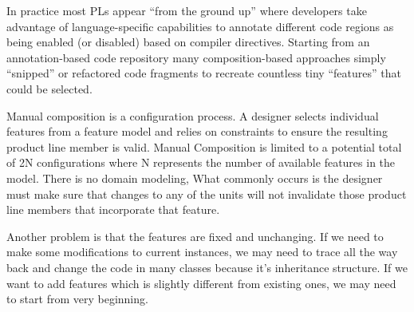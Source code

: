In practice most PLs appear “from the ground up” where developers take advantage of language-specific capabilities
 to annotate different code regions as being enabled (or disabled) based on compiler directives. Starting from an
 annotation-based code repository many composition-based approaches simply “snipped” or refactored code fragments
 to recreate countless tiny “features” that could be selected.

Manual composition is a configuration process. A designer selects individual features from a feature model and
relies on constraints to ensure the resulting product line member is valid. Manual Composition is limited to a
potential total of 2N configurations where N represents the number of available features in the model. There is no
 domain modeling, What commonly occurs is the designer must make sure that changes to any of the units will not invalidate those product
 line members that incorporate that feature.

 Another problem is that the features are fixed and unchanging. If we need to make some modifications to current
 instances, we may need to trace all the way back and change the code in many classes because it’s inheritance
 structure. If we want to add features which is slightly different from existing ones, we may need to start from
 very beginning.
